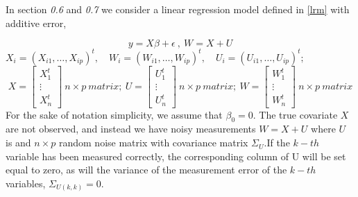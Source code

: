 \documentclass[12pt]{report}
\begin{document}
In section \textit{0.6} and \textit{0.7} we consider a linear regression model defined in \eqref{lrm} with additive error,

\begin{equation}
	y=X\beta + \epsilon\ ,\ W=X+U
	\label{f46}
\end{equation}
$X_{i}=(X_{i1},\dots,X_{ip})^{t},\quad W_{i}=(W_{i1},\dots,W_{ip})^{t},\quad U_{i}=(U_{i1},\dots,U_{ip})^{t};$
$$ X=
\begin{bmatrix}
	X_{1}^{t} \\
	\vdots \\
	X_{n}^{t}
\end{bmatrix}\ n\times p\ matrix;\  U=
\begin{bmatrix}
	U_{1}^{t} \\
	\vdots \\
	U_{n}^{t}
\end{bmatrix}\ n\times p\ matrix;\  W=
\begin{bmatrix}
	W_{1}^{t} \\
	\vdots \\
	W_{n}^{t}
\end{bmatrix}\ n\times p\ matrix$$
For the sake of notation simplicity, we assume that $\beta_{0}=0$. The true covariate $X$ are not observed, and instead we have noisy measurements $W=X+U$ where $U$ is and $n\times p$ random noise matrix with covariance matrix $\Sigma_{U}$.If the $k-th$ variable has been measured correctly, the corresponding column of U will be set equal to zero, as will the variance of the measurement error of the $k-th$ variables, $\Sigma_{U(k,k)}=0$.
\end{document}
